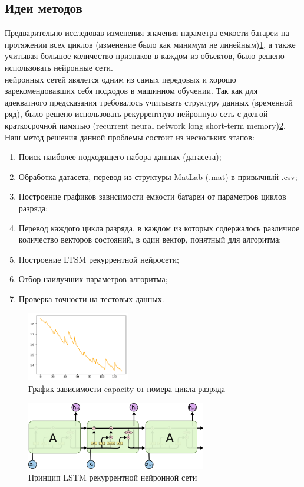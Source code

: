 \documentclass[russian,english,18pt,a4paper,reqno,dviphfm]{article}
\begin{document}
\newpage
\subsection{Идеи методов}
Предварительно исследовав изменения значения параметра емкости батареи на протяжении всех циклов (изменение было как минимум не линейным)\ref{fig:1}, а также учитывая большое количество признаков в каждом из объектов, было решено использовать нейронные сети. \\
 нейронных сетей явялется одним из самых передовых и хорошо зарекомендовавших себя подходов в машинном обучении. Так как для адекватного предсказания требовалось учитывать структуру данных (временной ряд), было решено использовать рекуррентную нейронную сеть с долгой краткосрочной памятью (recurrent neural network long short-term memory)\ref{fig:2}. \\
Наш метод решения данной проблемы состоит из нескольких этапов:
\begin{enumerate}
	\item Поиск наиболее подходящего набора данных (датасета);
	\item Обработка датасета, перевод из структуры MatLab (.mat) в привычный .csv;
	\item Построение графиков зависимости емкости батареи от параметров циклов разряда;
	\item Перевод каждого цикла разряда, в каждом из которых содержалось различное количество векторов состояний, в один вектор, понятный для алгоритма;
	\item Построение LTSM рекуррентной нейросети;
	\item Отбор наилучших параметров алгоритма;
	\item Проверка точности на тестовых данных.
\end{enumerate}
\begin{figure}[h!]
	\center
	\includegraphics[width=0.4\textwidth]{pic/cap.png}
	\caption{График зависимости capacity от номера цикла разряда} 
	\label{fig:1}
\end{figure}
\begin{figure}[h!]
	\center
	\includegraphics[width=0.7\textwidth]{pic/LSTM3-chain.png}
	\caption{Принцип LSTM рекуррентной нейронной сети} 
	\label{fig:2}
\end{figure}
\newpage
\end{document}

